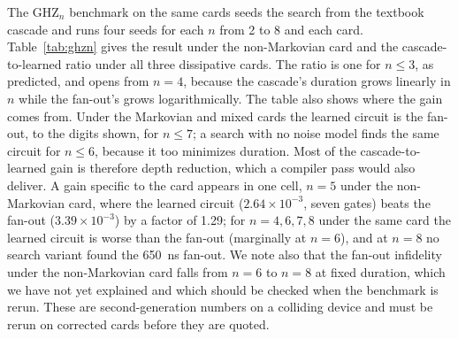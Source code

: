 \documentclass[10pt]{article}
\begin{document}
The GHZ$_n$ benchmark on the same cards seeds the search from the textbook
cascade and runs four seeds for each $n$ from 2 to 8 and each card.
Table~\ref{tab:ghzn} gives the result under the non-Markovian card and the
cascade-to-learned ratio under all three dissipative cards. The ratio is one
for $n \le 3$, as predicted, and opens from $n = 4$, because the cascade's
duration grows linearly in $n$ while the fan-out's grows logarithmically.
The table also shows where the gain comes from. Under the Markovian and mixed
cards the learned circuit is the fan-out, to the digits shown, for
$n \le 7$; a search with no noise model finds the same circuit for $n \le 6$,
because it too minimizes duration. Most of the cascade-to-learned gain is
therefore depth reduction, which a compiler pass would also deliver. A gain
specific to the card appears in one cell, $n = 5$ under the non-Markovian card,
where the learned circuit ($2.64\times10^{-3}$, seven gates) beats the fan-out
($3.39\times10^{-3}$) by a factor of 1.29; for $n = 4, 6, 7, 8$ under the same
card the learned circuit is worse than the fan-out (marginally at $n = 6$), and
at $n = 8$ no search variant found the 650~ns fan-out. We note also that the
fan-out infidelity under the non-Markovian card falls from $n = 6$ to $n = 8$
at fixed duration, which we have not yet explained and which should be checked
when the benchmark is rerun. These are second-generation numbers
on a colliding device and must be rerun on corrected cards before they are
quoted.
\end{document}
